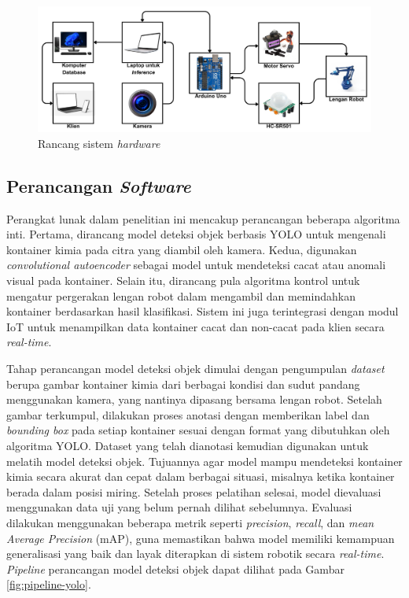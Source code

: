 \begin{figure}[H]
  \centering
  \includegraphics[width=\textwidth]{gambar/rancang.png}
  \caption{Rancang sistem \textit{hardware}}
  \label{fig:hardware}
\end{figure}
\vspace{-1em}

\vspace{1em}

\subsection{Perancangan \textit{Software}}
Perangkat lunak dalam penelitian ini mencakup perancangan beberapa
algoritma inti. Pertama, dirancang model deteksi objek berbasis YOLO
untuk mengenali kontainer kimia pada citra yang diambil oleh kamera.
Kedua, digunakan \textit{convolutional autoencoder} sebagai model untuk
mendeteksi cacat atau anomali visual pada kontainer. Selain itu,
dirancang pula algoritma kontrol untuk mengatur pergerakan lengan
robot dalam mengambil dan memindahkan kontainer berdasarkan hasil
klasifikasi. Sistem ini juga terintegrasi dengan modul IoT untuk
menampilkan data kontainer cacat dan non-cacat pada klien secara
\textit{real-time}. \par

Tahap perancangan model deteksi objek dimulai dengan pengumpulan
\textit{dataset} berupa gambar kontainer kimia dari berbagai kondisi dan sudut
pandang menggunakan kamera, yang nantinya dipasang bersama lengan
robot. Setelah gambar terkumpul, dilakukan proses anotasi dengan
memberikan label dan \textit{bounding box} pada setiap kontainer sesuai dengan
format yang dibutuhkan oleh algoritma YOLO. Dataset yang telah
dianotasi kemudian digunakan untuk melatih model deteksi objek.
Tujuannya agar model mampu mendeteksi kontainer kimia secara akurat
dan cepat dalam berbagai situasi, misalnya ketika kontainer berada
dalam posisi miring. Setelah proses pelatihan selesai, model
dievaluasi menggunakan data uji yang belum pernah dilihat sebelumnya.
Evaluasi dilakukan menggunakan beberapa metrik seperti \textit{precision},
\textit{recall}, dan \textit{mean Average Precision} (mAP), guna
memastikan bahwa model
memiliki kemampuan generalisasi yang baik dan layak diterapkan di
sistem robotik secara \textit{real-time}. \textit{Pipeline}
perancangan model deteksi
objek dapat dilihat pada Gambar \ref{fig:pipeline-yolo}.

